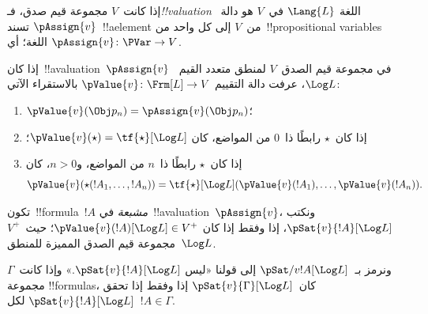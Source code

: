 \documentclass[../../../include/open-logic-section]{subfiles}
\begin{document}


\begin{defn}[!!^{valuation}s]
إذا كانت~$V$ مجموعة قيم صدق، فـ\emph{!!{valuation}} اللغة
$\Lang{L}$ في~$V$ هو دالة~$\pAssign{v}$ تسند~!!a{element} من~$V$
إلى كل واحد من~!!{propositional variable}s اللغة؛ أي
$\pAssign{v} \colon \PVar \to V$.
\end{defn}

\begin{defn}
  إذا كان~!!a{valuation}~$\pAssign{v}$ في مجموعة قيم الصدق~$V$
  لمنطق متعدد القيم~$\Log L$، عرفت دالة التقييم
  $\pValue{v} \colon \Frm[L] \to V$ بالاستقراء الآتي:
  \begin{enumerate}
    \item $\pValue{v}(\Obj p_n) = \pAssign{v}(\Obj p_n)$؛
    \item إذا كان~$\star$ رابطًا ذا~$0$ من المواضع، كان
    $\pValue{v}(\star) = \tf{\star}[\Log L]$؛
    \item إذا كان~$\star$ رابطًا ذا~$n$ من المواضع، و$n>0$، كان
    \[
      \pValue{v}(\star(!A_1, \dots, !A_n)) = \tf{\star}[\Log L]
      (\pValue{v}(!A_1), \dots, \pValue{v}(!A_n)).
    \]
  \end{enumerate}
\end{defn}

\begin{defn}[الإشباع]
 تكون~!!{formula}~$!A$ \emph{مشبعة}
  في~!!a{valuation}~$\pAssign{v}$، ونكتب
  $\pSat{v}{!A}[\Log L]$، إذا وفقط إذا كان
  $\pValue{v}(!A)[\Log L] \in V^+$؛ حيث~$V^+$ مجموعة قيم الصدق
  المميزة للمنطق~$\Log L$.
  
  ونرمز بـ~$\pSat/{v}{!A}[\Log L]$ إلى قولنا «ليس
  $\pSat{v}{!A}[\Log L]$.» وإذا كانت~$\Gamma$ مجموعة
  !!{formula}s، كان~$\pSat{v}{\Gamma}[\Log L]$ إذا وفقط إذا تحقق
  $\pSat{v}{!A}[\Log L]$ لكل~$!A \in \Gamma$.
\end{defn}
\end{document}
